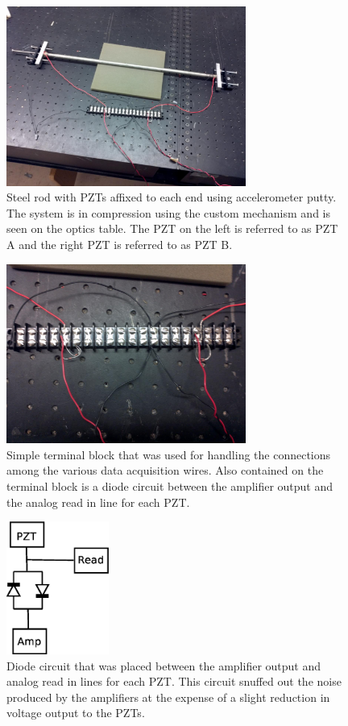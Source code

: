\begin{figure}[ht!]
\centering
\includegraphics[width=0.7\textwidth]{eps_pics/steelUncrackedFull}
\caption{Steel rod with PZTs affixed to each end using accelerometer putty. The system is in compression using the custom mechanism and is seen on the optics table. The PZT on the left is referred to as PZT A and the right PZT is referred to as PZT B. 
 	 \label{fig:steelUncrackedFull}} 
\end{figure}

\begin{figure}[ht!]
\centering
\includegraphics[width=0.7\textwidth]{eps_pics/junctionBox}
\caption{Simple terminal block that was used for handling the connections among the various data acquisition wires. Also contained on the terminal block is a diode circuit between the amplifier output and the analog read in line for each PZT. 
 	 \label{fig:junctionBox}} 
\end{figure}

\begin{figure}[ht!]
\centering
\includegraphics[width=0.3\textwidth]{eps_pics/diodeCircuit}
\caption{Diode circuit that was placed between the amplifier output and analog read in lines for each PZT. This circuit snuffed out the noise produced by the amplifiers at the expense of a slight reduction in voltage output to the PZTs. 
 	 \label{fig:diodeCircuit}} 
\end{figure}

